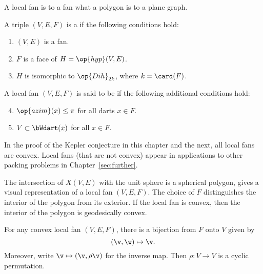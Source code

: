 A local fan is to a fan what a polygon is to a plane graph.  


\begin{definition} \label{def:convex-local}
A triple $(V,E,F)$ is a  if the following conditions hold:
\begin{enumerate} 
\item {} $(V,E)$ is a fan.
\item {} $F$ is a face of $H = \op{hyp}(V,E)$.
\item {} $H$ is isomorphic to $\op{Dih}_{2k}$, where $k =
\card(F)$.
\end{enumerate}
A local fan $(V,E,F)$ is said to be  if the following
additional conditions hold:
\begin{enumerate}
\setcounter{enumi}{3}
\item %
 $\op{azim}(x)\le \pi$ for all darts $x\in F$.
\item {} $V\subset \bWdart(x)$ for all $x\in F$.
\end{enumerate}
\end{definition}
%

In the proof of the Kepler conjecture in this chapter and the next,
all local fans are convex.  Local fans (that are not convex) appear in
applications to other packing problems in Chapter~\ref{sec:further}.

\begin{remark}[visualization]
  The intersection of $X(V,E)$ with the unit sphere is a spherical
  polygon, gives a visual representation of a local fan $(V,E,F)$.
  The choice of $F$ distinguishes the interior of the polygon from its
  exterior.  If the local fan is convex, then the interior of the
  polygon is geodesically convex.
\end{remark}


\begin{lemma}[]%
For any convex local fan $(V,E,F)$, there is a bijection from $F$ onto $V$
given by
\[ 
(\v,\w) \mapsto \v.
\] 
Moreover, write $\v\mapsto(\v,\rho\v)$ for the inverse map. 
Then $\rho:V\to V$ is a cyclic permutation.
\end{lemma}
%

